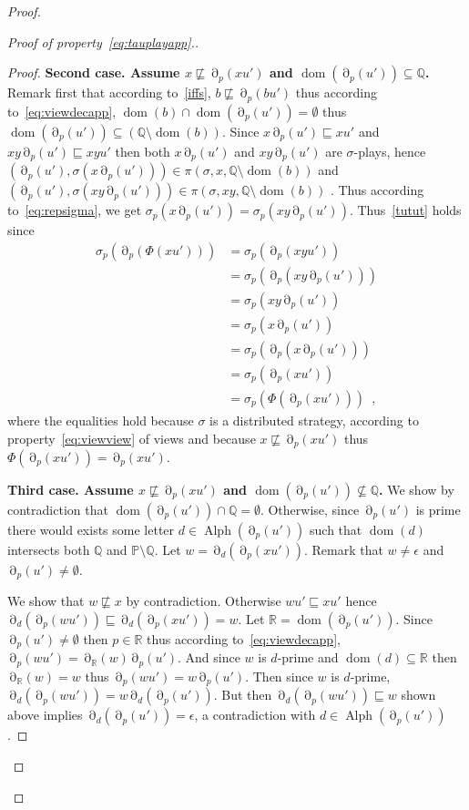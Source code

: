 \documentclass[a4paper,UKenglish]{lipics-v2016}
\newcommand{\PP}{\mathbb{P}}
\newcommand{\QQ}{\mathbb{Q}}
\newcommand{\RR}{\mathbb{R}}
\newcommand{\pref}{\sqsubseteq}
\DeclareMathOperator{\dom}{dom}
\DeclareMathOperator{\view}{\partial}
\DeclareMathOperator{\alphabet}{Alph}
\begin{document}
\begin{proof}
\begin{proof}[Proof of property~\eqref{eq:tauplayapp}.]
\begin{proof}
{\bf Second case.
Assume $x\not\pref \view_p(xu')$
and
$\dom(\view_p(u'))\subseteq \QQ$.}
Remark first that 
according to~\eqref{iffs},
$b\not \pref \view_p(bu')$ thus according to~\eqref{eq:viewdecapp},
$\dom(b) \cap \dom(\view_p(u'))=\emptyset$
thus 
$\dom(\view_p(u'))\subseteq (\QQ\setminus \dom(b))$.
Since $x\view_p(u')\pref xu'$ and $xy\view_p(u') \pref xyu'$ 
then both $x\view_p(u')$ and $xy\view_p(u')$ are $\sigma$-plays,
hence 
$(\view_p(u'),\sigma(x\view_p(u')))\in \pi\left(\sigma,x,\QQ\setminus\dom(b)\right)$
and
$(\view_p(u'),\sigma(xy\view_p(u')))\in \pi\left(\sigma,xy,\QQ\setminus\dom(b)\right)$
.
Thus according to~\eqref{eq:repsigma},
we get $\sigma_p(x\view_p(u'))=\sigma_p(xy\view_p(u'))$.
Thus~\eqref{tutut} holds since
\begin{align*}
\sigma_p(\view_p(\Phi(xu')))
&=
\sigma_p(\view_p(xyu'))\\
&=
\sigma_p(\view_p(xy\view_p(u')))\\
&=
\sigma_p(xy\view_p(u'))\\
&=
\sigma_p(x\view_p(u'))\\
&=
\sigma_p(\view_p(x\view_p(u')))\\
&=
\sigma_p(\view_p(xu'))\\
&=
\sigma_p(\Phi(\view_p(xu')))
\enspace,
\end{align*}
where the equalities hold because $\sigma$ is a distributed strategy,
according to property~\eqref{eq:viewview} of views
and because $x\not\pref \view_p(xu')$
thus $\Phi(\view_p(xu'))=\view_p(xu')$.

\medskip




{\bf Third case. Assume $x\not\pref \view_p(xu')$
and $\dom(\view_p(u'))\not\subseteq \QQ$.}
We show by contradiction that
$\dom(\view_p(u'))\cap \QQ =\emptyset$.
Otherwise, since $\view_p(u')$ is prime there would exists
some letter $d \in\alphabet(\view_p(u'))$ such that $\dom(d)$
intersects both $\QQ$ and $\PP\setminus \QQ$.
Let $w =\view_d(\view_p(xu'))$.
Remark that $w\neq \epsilon$ and $\view_p(u')\neq \emptyset$.

We show that $w\not \pref x$ by contradiction.
Otherwise $wu' \pref xu'$ hence
$\view_d(\view_p(wu')) \pref \view_d(\view_p(xu'))=w$.
Let $\RR=\dom(\view_p(u'))$.
Since $\view_p(u')\neq \emptyset$ then $p\in \RR$ thus
according to~\eqref{eq:viewdecapp},
$\view_p(wu')=\view_\RR(w)\view_p(u')$.
And since $w$ is $d$-prime and $\dom(d) \subseteq \RR$
then $\view_\RR(w)=w$ thus $\view_p(wu')=w\view_p(u')$.
Then since $w$ is $d$-prime,
$\view_d(\view_p(wu'))=w \view_d(\view_p(u'))$.
But then $\view_d(\view_p(wu')) \pref w$ shown above implies 
$\view_d(\view_p(u'))=\epsilon$, a contradiction with $d \in\alphabet(\view_p(u'))$.


\end{proof}
\end{proof}
\end{proof}
\end{document}
